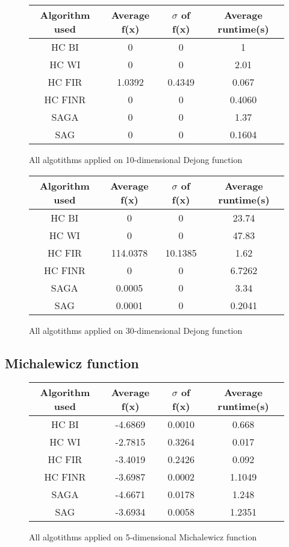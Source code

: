 \documentclass{article}
\begin{document}
\begin{figure}[H]
	\begin{tabular}{|c||c|c|c|} \hline
		Algorithm used & Average f(x) & $\sigma$ of f(x) & Average runtime(s) \\ \hline \hline
		HC BI & 0 & 0 & 1 \\ \hline
		HC WI & 0 & 0 & 2.01 \\ \hline
		HC FIR & 1.0392 & 0.4349 & 0.067 \\ \hline
		HC FINR & 0 & 0 & 0.4060 \\ \hline
		SAGA & 0 & 0 & 1.37 \\ \hline
		SAG & 0 & 0 & 0.1604 \\ \hline
\end{tabular}
\caption{All algotithms applied on 10-dimensional Dejong function}
\end{figure}

\begin{figure}[H]
	\begin{tabular}{|c||c|c|c|} \hline
		Algorithm used & Average f(x) & $\sigma$ of f(x) & Average runtime(s) \\ \hline \hline
		HC BI & 0 & 0 & 23.74 \\ \hline
		HC WI & 0 & 0 & 47.83 \\ \hline
		HC FIR & 114.0378 & 10.1385 & 1.62 \\ \hline
		HC FINR & 0 & 0 & 6.7262 \\ \hline
		SAGA & 0.0005 & 0 & 3.34 \\ \hline
		SAG & 0.0001 & 0 & 0.2041 \\ \hline
\end{tabular}
\caption{All algotithms applied on 30-dimensional Dejong function}
\end{figure}

\subsection{Michalewicz function}

\begin{figure}[H]
	\begin{tabular}{|c||c|c|c|} \hline
		Algorithm used & Average f(x) & $\sigma$ of f(x) & Average runtime(s) \\ \hline \hline
		HC BI & -4.6869 & 0.0010 & 0.668 \\ \hline
		HC WI & -2.7815 & 0.3264 & 0.017 \\ \hline
		HC FIR & -3.4019 & 0.2426 & 0.092 \\ \hline
		HC FINR & -3.6987 & 0.0002 & 1.1049 \\ \hline
		SAGA & -4.6671 & 0.0178 & 1.248 \\ \hline
		SAG & -3.6934 & 0.0058 & 1.2351 \\ \hline
\end{tabular}
\caption{All algotithms applied on 5-dimensional Michalewicz function}
\end{figure}
\end{document}
